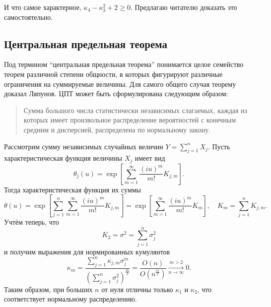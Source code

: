 И что самое характерное, \( \kappa_4 - \kappa_3^2 + 2 \ge 0 \). Предлагаю
читателю доказать это самостоятельно.

\subsection{Центральная предельная теорема}

Под термином ``центральная предельная теорема'' понимается целое семейство
теорем различной степени общности, в которых фигурируют различные ограничения на
суммируемые величины. Для самого общего случая теорему доказал Ляпунов. ЦПТ
может быть сформулирована следующим образом:
\begin{quotation}
    Сумма большого числа статистически независимых слагаемых, каждая из которых
    имеет произвольное распределение вероятностей с конечным средним и
    дисперсией, распределена по нормальному закону.
\end{quotation}

Рассмотрим сумму независимых случайных величин \( Y = \sum_{j=1}^{n} X_j \).
Пусть характеристическая функция величины \( X_j \) имеет вид
\[
    \theta_j(u)=\exp\left[\sum_{m=1}^\infty\frac{(iu)^m}{m!}K_{j,m}\right].
\]
Тогда характеристическая функция их суммы
\[
    \theta(u)=\exp\left[\sum_{j=1}^n\sum_{m=1}^\infty
        \frac{(iu)^m}{m!}K_{j,m}\right] =
        \exp\left[\sum_{m=1}^\infty\frac{(iu)^m}{m!}K_m\right],\quad
    K_m = \sum_{j=1}^n K_{j,m}.
\]
Учтём теперь, что
\[
    K_2 = \sigma^2 = \sum_{j=1}^n \sigma_j^2
\]
и получим выражения для нормированных кумулянтов
\[
    \kappa_m = \frac{\sum\limits_{j=1}^n \kappa_{j,m} \sigma_j^m }
        {\left(\sum\limits_{j=1}^n \sigma_j^2\right)^\frac{m}{2}} =
        \frac{O(n)}{O(n^\frac{m}{2})} \xrightarrow[n\to\infty]{m>2} 0.
\]
Таким образом, при больших \( n \) от нуля отличны только \( \kappa_1 \) и
\( \kappa_2 \), что соответствует нормальному распределению.

